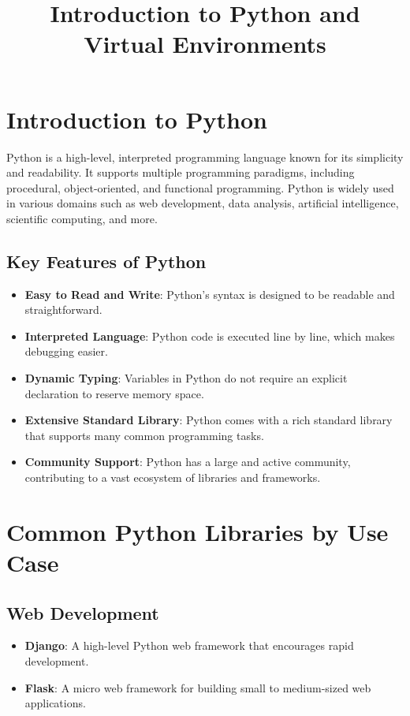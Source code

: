 \documentclass{article}
\title{Introduction to Python and Virtual Environments}
\author{}
\date{}
\begin{document}
	
	\maketitle
	
	\section{Introduction to Python}
	
	Python is a high-level, interpreted programming language known for its simplicity and readability. It supports multiple programming paradigms, including procedural, object-oriented, and functional programming. Python is widely used in various domains such as web development, data analysis, artificial intelligence, scientific computing, and more.
	
	\subsection{Key Features of Python}
	\begin{itemize}
		\item \textbf{Easy to Read and Write}: Python's syntax is designed to be readable and straightforward.
		\item \textbf{Interpreted Language}: Python code is executed line by line, which makes debugging easier.
		\item \textbf{Dynamic Typing}: Variables in Python do not require an explicit declaration to reserve memory space.
		\item \textbf{Extensive Standard Library}: Python comes with a rich standard library that supports many common programming tasks.
		\item \textbf{Community Support}: Python has a large and active community, contributing to a vast ecosystem of libraries and frameworks.
	\end{itemize}
	
	\section{Common Python Libraries by Use Case}
	
	\subsection{Web Development}
	\begin{itemize}
		\item \textbf{Django}: A high-level Python web framework that encourages rapid development.
		\item \textbf{Flask}: A micro web framework for building small to medium-sized web applications.
	\end{itemize}
	
\end{document}
